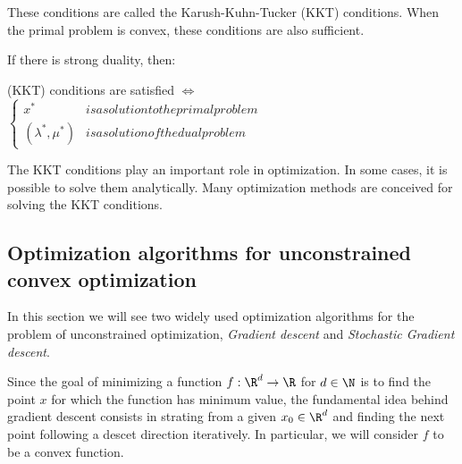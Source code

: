 \documentclass[toc, titlepaged]{../cs-classes/cs-classes}
\begin{document}
These conditions are called the Karush-Kuhn-Tucker (KKT) conditions. When the primal problem is convex, these conditions are also sufficient.

\begin{theorem}
    If there is strong duality, then:
    \begin{center}
        (KKT) conditions are satisfied $\iff$ $\begin{cases*}
            x^* &is a solution to the primal problem\\
            (\lambda^*, \mu^*) & is a solution of the dual problem
        \end{cases*}$
    \end{center}
\end{theorem}

The KKT conditions play an important role in optimization. In some cases, it is possible to solve them analytically. Many optimization methods are conceived for solving the KKT conditions.

\subsection{Optimization algorithms for unconstrained convex optimization}
In this section we will see two widely used optimization algorithms for the problem of unconstrained optimization, \emph{Gradient descent} and \emph{Stochastic Gradient descent}.

Since the goal of minimizing a function $f:\R^d\to\R$ for $d\in\N$ is to find the point $x$ for which the function has minimum value, the fundamental idea behind gradient descent consists in strating from a given $x_0\in\R^d$ and finding the next point following a descet direction iteratively. In particular, we will consider $f$ to be a convex function.
\end{document}
